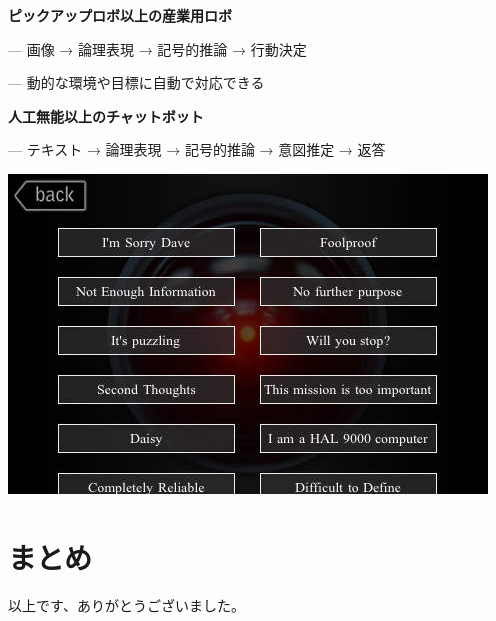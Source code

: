 \begin{container-fluid}
\begin{row-fluid}
\begin{span6}
\textbf{ピックアップロボ以上の産業用ロボ}

--- 画像 → 論理表現 → 記号的推論 → 行動決定

--- 動的な環境や目標に自動で対応できる

\textbf{人工無能以上のチャットボット}

--- テキスト → 論理表現 → 記号的推論 → 意図推定 → 返答
\end{span6}
\begin{span6}
\includegraphics{img/static/hal-speaking.jpg}
\end{span6}
\end{row-fluid}
\end{container-fluid}


\section{まとめ}
\label{sec-4}

\begin{resume}
以上です、ありがとうございました。
\end{resume}

